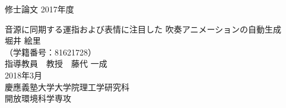 {\LARGE 修士論文} \hspace{\fill} {\LARGE 2017年度}
\vspace{3cm}
\begin{center}
{\LARGE 音源に同期する運指および表情に注目した	吹奏アニメーションの自動生成}
\\
\vspace{2cm}
{\LARGE 堀井 絵里} \\ \vspace{1.5ex}
{\LARGE （学籍番号：81621728）} \\
\vspace{6.5cm}
{\LARGE 指導教員　教授　藤代 一成} \\
\vspace{2.5cm}
{\Large 2018年3月} \\
\vspace{0.8cm}
{\LARGE 慶應義塾大学大学院理工学研究科} \\ \vspace{1.5ex}
{\LARGE 開放環境科学専攻} \\
\end{center}
